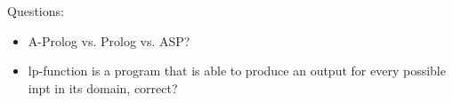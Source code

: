 \documentclass[runningheads]{llncs}
\begin{document}
Questions: 

\begin{itemize}
    \item A-Prolog vs. Prolog vs. ASP?
    \item lp-function is a program that is able to produce an output for every possible inpt in its domain, correct?
\end{itemize}



\end{document}
